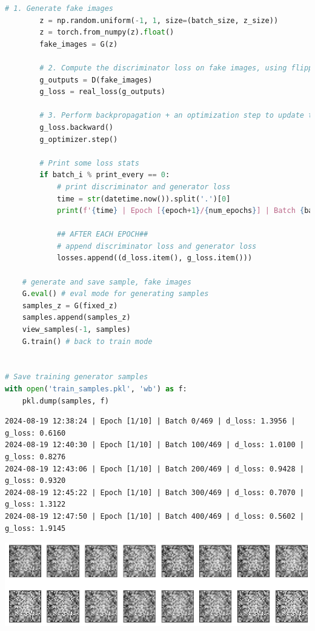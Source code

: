 \begin{lstlisting}[language=Python]
        # 1. Generate fake images
        z = np.random.uniform(-1, 1, size=(batch_size, z_size))
        z = torch.from_numpy(z).float()
        fake_images = G(z)
        
        # 2. Compute the discriminator loss on fake images, using flipped labels!
        g_outputs = D(fake_images)
        g_loss = real_loss(g_outputs)
        
        # 3. Perform backpropagation + an optimization step to update the generator's weights
        g_loss.backward()
        g_optimizer.step()

        # Print some loss stats
        if batch_i % print_every == 0:
            # print discriminator and generator loss
            time = str(datetime.now()).split('.')[0]
            print(f'{time} | Epoch [{epoch+1}/{num_epochs}] | Batch {batch_i}/{len(train_loader)} | d_loss: {d_loss.item():.4f} | g_loss: {g_loss.item():.4f}')
    
            ## AFTER EACH EPOCH##
            # append discriminator loss and generator loss
            losses.append((d_loss.item(), g_loss.item()))
    
    # generate and save sample, fake images
    G.eval() # eval mode for generating samples
    samples_z = G(fixed_z)
    samples.append(samples_z)
    view_samples(-1, samples)
    G.train() # back to train mode


# Save training generator samples
with open('train_samples.pkl', 'wb') as f:
    pkl.dump(samples, f)
\end{lstlisting}

\begin{lstlisting}
2024-08-19 12:38:24 | Epoch [1/10] | Batch 0/469 | d_loss: 1.3956 | g_loss: 0.6160
2024-08-19 12:40:30 | Epoch [1/10] | Batch 100/469 | d_loss: 1.0100 | g_loss: 0.8276
2024-08-19 12:43:06 | Epoch [1/10] | Batch 200/469 | d_loss: 0.9428 | g_loss: 0.9320
2024-08-19 12:45:22 | Epoch [1/10] | Batch 300/469 | d_loss: 0.7070 | g_loss: 1.3122
2024-08-19 12:47:50 | Epoch [1/10] | Batch 400/469 | d_loss: 0.5602 | g_loss: 1.9145
\end{lstlisting}

\includegraphics{img/genAdvNet/gan/output_24_1.png}

